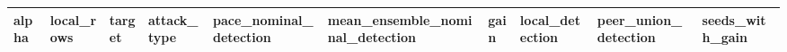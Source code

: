\begin{tabular}{llllllllll}
\toprule
alpha & local\_rows & target & attack\_type & pace\_nominal\_detection & mean\_ensemble\_nominal\_detection & gain & local\_detection & peer\_union\_detection & seeds\_with\_gain \\
\midrule

\bottomrule
\end{tabular}
